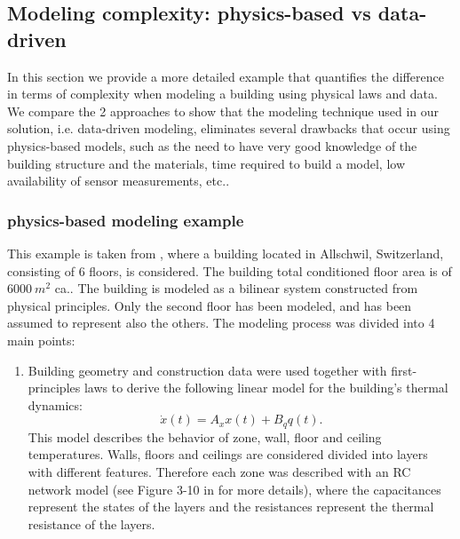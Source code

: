 \subsection{Modeling complexity: physics-based vs data-driven}
\textcolor[rgb]{0,0,1}{In this section we provide a more detailed example that quantifies the difference in terms of complexity when modeling a building using physical laws and data.
We compare the 2 approaches to show that the modeling technique used in our solution, i.e. data-driven modeling, eliminates several drawbacks that occur using physics-based models, such as the need to have very good knowledge of the building structure and the materials, time required to build a model, low availability of sensor measurements, etc..
\subsubsection{physics-based modeling example}
This example is taken from \cite{Sturzenegger2016}, where a building located in Allschwil, Switzerland, consisting of 6 floors, is considered. The building total conditioned floor area is of $6000\ m^2$ ca.. The building is modeled as a bilinear system constructed from physical principles. Only the second floor has been modeled, and has been assumed to represent also the others. The modeling process was divided into 4 main points:
\begin{enumerate}
	\item Building geometry and construction data were used together with first-principles laws to derive the following linear model for the building's thermal dynamics:
		\begin{equation}\label{E:RCZoneEq}
			\dot x(t) = A_x x(t) + B_q q(t).
		\end{equation}
		This model describes the behavior of zone, wall, floor and ceiling temperatures.
		Walls, floors and ceilings are considered divided into layers with different features. Therefore each zone was described with an RC network model (see Figure 3-10 in \cite{SturzeneggerTR} for more details), where the capacitances represent the states of the layers and the resistances represent the thermal resistance of the layers.

\end{enumerate}}
